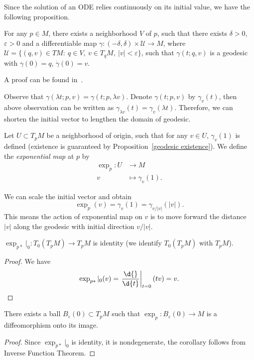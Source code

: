Since the solution of an ODE relies continuously on its initial value, we have the following proposition.
\begin{prop}\label{geodesic existence}
    For any $p\in M$, there exists a neighborhood $V$ of $p$, such that there exists $\delta>0$, $\varepsilon>0$ and a differentiable map $\gamma:(-\delta,\delta)\times\mathscr{U}\to M$, where $\mathscr{U}=\{(q,v)\in TM:\ q\in V,\ v\in T_qM,\ |v|<\varepsilon\}$, such that $\gamma(t;q,v)$ is a geodesic with $\gamma(0)=q$, $\dot\gamma(0)=v$.
\end{prop}
A proof can be found in~\cite[Chapter 3, Lemma 1]{Wu}.

Observe that $\gamma(\lambda t;p,v)=\gamma(t;p,\lambda v)$.
Denote $\gamma(t;p,v)$ by $\gamma_v(t)$, then above observation can be written as $\gamma_{\lambda v}(t)=\gamma_v(\lambda t)$.
Therefore, we can shorten the initial vector to lengthen the domain of geodesic.

\begin{defn}
    Let $U\subset T_pM$ be a neighborhood of origin, such that for any $v\in U$, $\gamma_v(1)$ is defined (existence is guaranteed by Proposition~\ref{geodesic existence}).
    We define the \emph{exponential map} at $p$ by
    \begin{align*}
        \exp_p:U&\to M\\
        v&\mapsto \gamma_v(1).
    \end{align*}
\end{defn}

\begin{rem}
    We can scale the initial vector and obtain
    \[\exp_p(v)=\gamma_v(1)=\gamma_{v/|v|}(|v|).\]
    This means the action of exponential map on $v$ is to move forward the distance $|v|$ along the geodesic with initial direction $v/|v|$.
\end{rem}

\begin{prop}
    $\exp_{p*}|_0:T_0(T_pM)\to T_pM$ is identity (we identify $T_0(T_pM)$ with $T_pM$).
\end{prop}
\begin{proof}
    We have
    \[\exp_{p*}|_0(v)=\left.\frac{\d{}}{\d{t}}\right|_{t=0}(tv)=v.\qedhere\]
\end{proof}

\begin{cor}
    There exists a ball $B_\varepsilon(0)\subset T_pM$ such that $\exp_p:B_\varepsilon(0)\to M$ is a diffeomorphism onto its image.
\end{cor}
\begin{proof}
    Since $\exp_{p*}|_0$ is identity, it is nondegenerate, the corollary follows from Inverse Function Theorem.
\end{proof}

